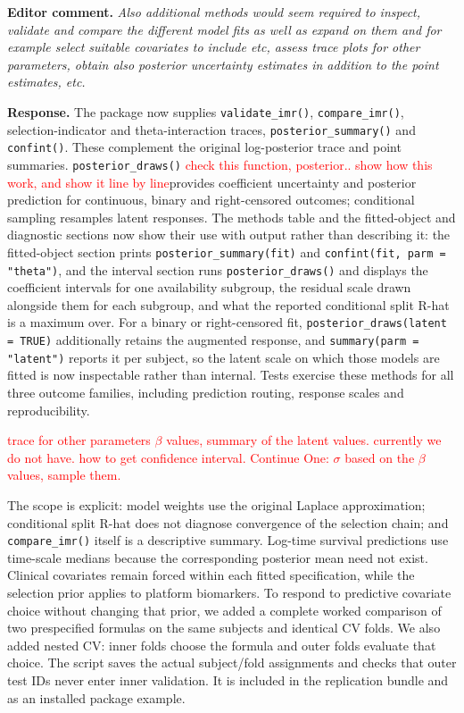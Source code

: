 \documentclass[11pt]{article}
\newcommand{\code}[1]{\texttt{#1}}
\newenvironment{editorcomment}
  {\par\smallskip\sloppy\noindent\textbf{Editor comment.}\itshape}
  {\par\smallskip\fussy}
\newenvironment{response}
  {\noindent\textbf{Response.}}
  {\par\smallskip}
\begin{document}
\begin{editorcomment}
Also additional methods would seem required to inspect, validate and compare the
different model fits as well as expand on them and for example select suitable
covariates to include etc, assess trace plots for other parameters, obtain also
posterior uncertainty estimates in addition to the point estimates, etc.
\end{editorcomment}
\begin{response}
The package now supplies \code{validate\_imr()}, \code{compare\_imr()},
selection-indicator and theta-interaction traces, \code{posterior\_summary()}
and \code{confint()}. These complement the original log-posterior trace and
point summaries. \code{posterior\_draws()} \textcolor{red}{check this function, posterior.. show how this work, and show it line by line}provides coefficient uncertainty
and posterior prediction for continuous, binary and right-censored outcomes;
conditional sampling resamples latent responses. The methods table and the
fitted-object and diagnostic sections now show their use with output rather
than describing it: the fitted-object section prints
\code{posterior\_summary(fit)} and \code{confint(fit, parm = "theta")}, and
the interval section runs \code{posterior\_draws()} and displays the
coefficient intervals for one availability subgroup, the residual scale drawn
alongside them for each subgroup, and what the reported conditional split
R-hat is a maximum over. For a binary or right-censored fit,
\code{posterior\_draws(latent = TRUE)} additionally retains the augmented
response, and \code{summary(parm = "latent")} reports it per subject, so the
latent scale on which those models are fitted is now inspectable rather than
internal. Tests exercise these methods for all three outcome
families, including prediction routing, response scales and reproducibility.

\textcolor{red}{trace for other parameters}
\textcolor{red}{$\beta$ values, summary of the latent values. currently we do not have. how to get confidence interval. Continue One: $\sigma$ based on the $\beta$ values, sample them. }

The scope is explicit: model weights use the original Laplace approximation;
conditional split R-hat does not diagnose convergence of the selection chain;
and \code{compare\_imr()} itself is a descriptive summary.
Log-time survival predictions use time-scale medians because the corresponding
posterior mean need not exist. Clinical covariates remain forced within each fitted specification, while the
selection prior applies to platform biomarkers. To respond to predictive
covariate choice without changing that prior, we added a complete worked
comparison of two prespecified formulas on the same subjects and identical CV
folds. We also added nested CV: inner folds choose the formula and outer folds
evaluate that choice. The script saves the actual subject/fold assignments and
checks that outer test IDs never enter inner validation. It is included in the
replication bundle and as an installed package example.


\end{response}
\end{document}
